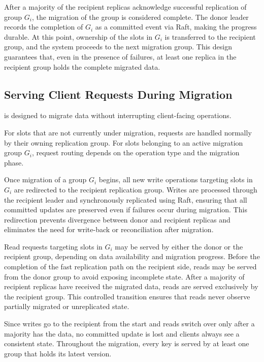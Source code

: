 After a majority of the recipient replicas acknowledge successful replication of group $G_i$, the migration of the group is considered complete.
The donor leader records the completion of $G_i$ as a committed event via Raft, making the progress durable.
At this point, ownership of the slots in $G_i$ is transferred to the recipient group, and the system proceeds to the next migration group.
This design guarantees that, even in the presence of failures, at least one replica in the recipient group holds the complete migrated data.


\subsection{Serving Client Requests During Migration}
\label{sec:serving-during-migration}

\OurImplementation{} is designed to migrate data without interrupting client-facing operations.

For slots that are not currently under migration, requests are handled normally by their owning replication group.
For slots belonging to an active migration group $G_i$, request routing depends on the operation type and the migration phase.

Once migration of a group $G_i$ begins, all new write operations targeting slots in $G_i$ are redirected to the recipient replication group.
Writes are processed through the recipient leader and synchronously replicated using Raft, ensuring that all committed updates are preserved even if failures occur during migration.
This redirection prevents divergence between donor and recipient replicas and eliminates the need for write-back or reconciliation after migration.

Read requests targeting slots in $G_i$ may be served by either the donor or the recipient group, depending on data availability and migration progress.
Before the completion of the fast replication path on the recipient side, reads may be served from the donor group to avoid exposing incomplete state.
After a majority of recipient replicas have received the migrated data, reads are served exclusively by the recipient group.
This controlled transition ensures that reads never observe partially migrated or unreplicated state.

Since writes go to the recipient from the start and reads switch over only after a majority has the data, no committed update is lost and clients always see a consistent state.
Throughout the migration, every key is served by at least one group that holds its latest version.
\fi

